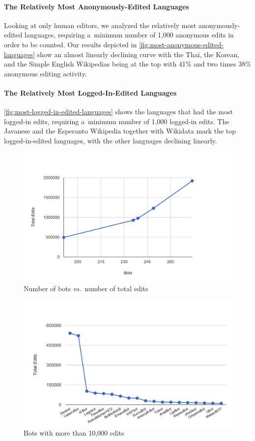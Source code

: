 \documentclass{sig-alternate}
\begin{document}
\paragraph{The Relatively Most Anonymously-Edited Languages}

Looking at only human editors, we analyzed the relatively
most anonymously-edited languages, requiring a~minimum
number of 1,000 anonymous edits in order to be counted.
Our results depicted in \autoref{fig:most-anonymous-edited-languages}
show an almost linearly declining curve with the Thai,
the Korean, and the Simple English Wikipedias being at the top
with 41\% and two times 38\% anonymous editing activity. 

\paragraph{The Relatively Most Logged-In-Edited Languages}

\autoref{fig:most-logged-in-edited-languages} shows
the languages that had the most logged-in edits,
requiring a~minimum number of 1,000 logged-in edits.
The Javanese and the Esperanto Wikipedia together with Wikidata
mark the top logged-in-edited languages,
with the other languages declining linearly.

\begin{figure}[p]
  \center
  \includegraphics[width=0.8\linewidth]{bots-total-edits.pdf}
  \caption{Number of bots \emph{vs.}\ number of total edits}
  \label{fig:bots-total-edits}
\end{figure}

\begin{figure}[p]
  \center
  \includegraphics[width=\linewidth]{most-active-bots.pdf}
  \caption{Bots with more than 10,000 edits}
  \label{fig:most-active-bots}
\end{figure}
\end{document}
